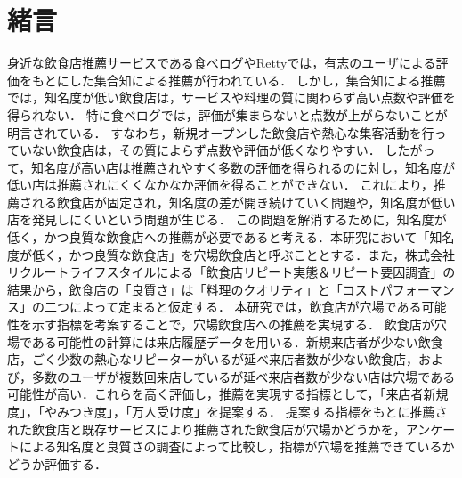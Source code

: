 \chapter{緒言}
\label{chap:intro}
身近な飲食店推薦サービスである食べログ\footnotemark{}やRetty\footnotemark{}では，有志のユーザによる評価をもとにした集合知による推薦が行われている．
しかし，集合知による推薦では，知名度が低い飲食店は，サービスや料理の質に関わらず高い点数や評価を得られない．
特に食べログでは，評価が集まらないと点数が上がらないことが明言されている\cite{score}．
すなわち，新規オープンした飲食店や熱心な集客活動を行っていない飲食店は，その質によらず点数や評価が低くなりやすい．
したがって，知名度が高い店は推薦されやすく多数の評価を得られるのに対し，知名度が低い店は推薦されにくくなかなか評価を得ることができない．
これにより，推薦される飲食店が固定され，知名度の差が開き続けていく問題や，知名度が低い店を発見しにくいという問題が生じる．
この問題を解消するために，知名度が低く，かつ良質な飲食店への推薦が必要であると考える．本研究において「知名度が低く，かつ良質な飲食店」を穴場飲食店と呼ぶこととする．また，株式会社リクルートライフスタイルによる「飲食店リピート実態＆リピート要因調査」\cite{repeat}の結果から，飲食店の「良質さ」は「料理のクオリティ」と「コストパフォーマンス」の二つによって定まると仮定する．
本研究では，飲食店が穴場である可能性を示す指標を考案することで，穴場飲食店への推薦を実現する．
飲食店が穴場である可能性の計算には来店履歴データを用いる．新規来店者が少ない飲食店，ごく少数の熱心なリピーターがいるが延べ来店者数が少ない飲食店，および，多数のユーザが複数回来店しているが延べ来店者数が少ない店は穴場である可能性が高い．これらを高く評価し，推薦を実現する指標として，「来店者新規度」，「やみつき度」，「万人受け度」を提案する．
提案する指標をもとに推薦された飲食店と既存サービスにより推薦された飲食店が穴場かどうかを，アンケートによる知名度と良質さの調査によって比較し，指標が穴場を推薦できているかどうか評価する．
